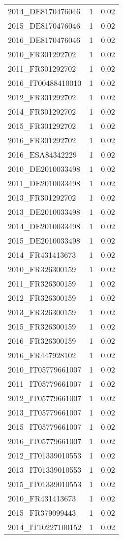 \begin{table*}[htbp]
\begin{tabular}{lrr}
2014_DE8170476046 & 1 & 0.02 \\
2015_DE8170476046 & 1 & 0.02 \\
2016_DE8170476046 & 1 & 0.02 \\
2010_FR301292702 & 1 & 0.02 \\
2011_FR301292702 & 1 & 0.02 \\
2016_IT00488410010 & 1 & 0.02 \\
2012_FR301292702 & 1 & 0.02 \\
2014_FR301292702 & 1 & 0.02 \\
2015_FR301292702 & 1 & 0.02 \\
2016_FR301292702 & 1 & 0.02 \\
2016_ESA84342229 & 1 & 0.02 \\
2010_DE2010033498 & 1 & 0.02 \\
2011_DE2010033498 & 1 & 0.02 \\
2013_FR301292702 & 1 & 0.02 \\
2013_DE2010033498 & 1 & 0.02 \\
2014_DE2010033498 & 1 & 0.02 \\
2015_DE2010033498 & 1 & 0.02 \\
2014_FR431413673 & 1 & 0.02 \\
2010_FR326300159 & 1 & 0.02 \\
2011_FR326300159 & 1 & 0.02 \\
2012_FR326300159 & 1 & 0.02 \\
2013_FR326300159 & 1 & 0.02 \\
2015_FR326300159 & 1 & 0.02 \\
2016_FR326300159 & 1 & 0.02 \\
2016_FR447928102 & 1 & 0.02 \\
2010_IT05779661007 & 1 & 0.02 \\
2011_IT05779661007 & 1 & 0.02 \\
2012_IT05779661007 & 1 & 0.02 \\
2013_IT05779661007 & 1 & 0.02 \\
2015_IT05779661007 & 1 & 0.02 \\
2016_IT05779661007 & 1 & 0.02 \\
2012_IT01339010553 & 1 & 0.02 \\
2013_IT01339010553 & 1 & 0.02 \\
2015_IT01339010553 & 1 & 0.02 \\
2010_FR431413673 & 1 & 0.02 \\
2015_FR379099443 & 1 & 0.02 \\
2014_IT10227100152 & 1 & 0.02 \\

\end{tabular}
\end{table*}
